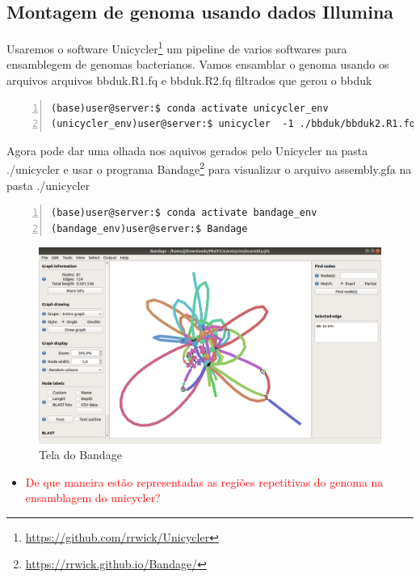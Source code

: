 \documentclass[letter,11pt]{book}
\begin{document}
\subsection{Montagem de genoma usando dados Illumina}
Usaremos o software Unicycler\footnote{\url{https://github.com/rrwick/Unicycler}} um pipeline de varios softwares para ensamblegem de genomas bacterianos. Vamos ensamblar o genoma usando os arquivos arquivos bbduk.R1.fq e bbduk.R2.fq filtrados que gerou o bbduk

\begin{Verbatim}[commandchars=!\{\}, numbers=left,label= Montando leituras com Unicycler,frame=topline,fontsize=\scriptsize]
(base)user@server:$ conda activate unicycler_env
(unicycler_env)user@server:$ unicycler  -1 ./bbduk/bbduk2.R1.fq -2 ./bbduk/bbduk2.R2.fq -o ./unicycler/
\end{Verbatim}

Agora pode dar uma olhada nos aquivos gerados pelo Unicycler na pasta ./unicycler e usar o programa Bandage\footnote{\url{https://rrwick.github.io/Bandage/}} para visualizar o arquivo assembly.gfa na pasta ./unicycler 

\begin{Verbatim}[commandchars=!\{\}, numbers=left,label= Abrindo o Bandage,frame=topline,fontsize=\scriptsize]
(base)user@server:$ conda activate bandage_env 
(bandage_env)user@server:$ Bandage
\end{Verbatim}

\begin{figure}[ht]
\centering
   \includegraphics[width=12cm]{Figs/bandage.png}
  \caption[Visualização da montagem do unicycler]{\label{bandage}Tela do Bandage}
\end{figure}

\begin{itemize}
\item \textcolor{red}{De que maneira estão representadas as regiões repetitivas do genoma na ensamblagem do unicycler?}
\end{itemize}
\end{document}
